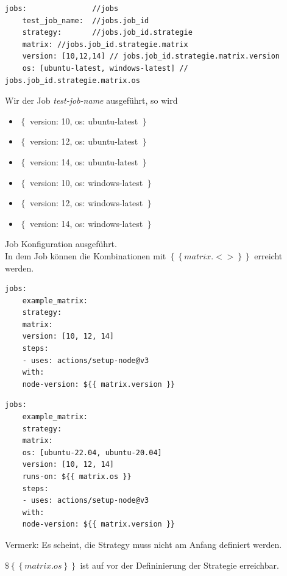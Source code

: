 \begin{lstlisting}[style=Config, caption={GitHub matrix strategy}, captionpos=b]
	jobs: 				//jobs
	test_job_name:	//jobs.job_id
	strategy:		//jobs.job_id.strategie
	matrix:	//jobs.job_id.strategie.matrix
	version: [10,12,14] // jobs.job_id.strategie.matrix.version
	os: [ubuntu-latest, windows-latest] // jobs.job_id.strategie.matrix.os
\end{lstlisting}
Wir der Job \textit{test-job-name} ausgeführt, so wird
\begin{itemize}
	\item $\left\lbrace \right.$ version: 10, os: ubuntu-latest $\left. \right\rbrace$
	\item $\left\lbrace \right.$ version: 12, os: ubuntu-latest $\left. \right\rbrace$
	\item $\left\lbrace \right.$ version: 14, os: ubuntu-latest $\left. \right\rbrace$
	\item $\left\lbrace \right.$ version: 10, os: windows-latest $\left. \right\rbrace$
	\item $\left\lbrace \right.$ version: 12, os: windows-latest $\left. \right\rbrace$
	\item $\left\lbrace \right.$ version: 14, os: windows-latest $\left. \right\rbrace$
\end{itemize}
Job Konfiguration ausgeführt. \\

In dem Job können die Kombinationen mit $\left\lbrace \left\lbrace matrix.<> \right\rbrace\right\rbrace$ erreicht werden.

\begin{lstlisting}[style=Config, caption={Single Dimension Matrix}, captionpos=b]
	jobs:
	example_matrix:
	strategy:
	matrix:
	version: [10, 12, 14]
	steps:
	- uses: actions/setup-node@v3
	with:
	node-version: ${{ matrix.version }}
\end{lstlisting}

\begin{lstlisting}[style=Config, caption={Multi Dimension Matrix}, captionpos=b]
	jobs:
	example_matrix:
	strategy:
	matrix:
	os: [ubuntu-22.04, ubuntu-20.04]
	version: [10, 12, 14]
	runs-on: ${{ matrix.os }}
	steps:
	- uses: actions/setup-node@v3
	with:
	node-version: ${{ matrix.version }}
\end{lstlisting}
Vermerk: Es scheint, die Strategy muss nicht am Anfang definiert werden. 

$\$ \left\lbrace \left\lbrace matrix.os\right\rbrace\right\rbrace$ ist auf vor der Defininierung der Strategie erreichbar.



